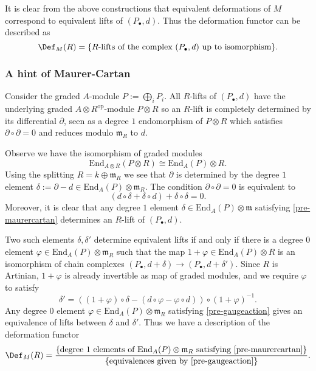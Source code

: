 It is clear from the above constructions that equivalent deformations of \(M\)
correspond to equivalent lifts of \((P_\bullet, d)\). Thus
the deformation functor can be described as
\[\Def_M(R) = \{\text{\(R\)-lifts of the complex \((P_\bullet, d)\)
up to isomorphism}\}.\]

\subsubsection{A hint of Maurer-Cartan} Consider the graded \(A\)-module
\(P:=\bigoplus_i P_i\). All \(R\)-lifts of \((P_\bullet, d)\) have the
underlying graded \(A\otimes
R^{\text{op}}\)-module \(P\otimes R\) so an \(R\)-lift is completely determined
by its differential \(\partial\), seen as a degree \(1\) endomorphism of
\(P\otimes R\) which satisfies \(\partial \circ \partial = 0\)
and reduces modulo \(\mathfrak{m}_R\) to \(d\). 

Observe we have the isomorphism of graded modules
\[\text{End}_{A\otimes R}(P\otimes R) \cong \text{End}_A(P)\otimes R.\]
Using the splitting \(R=k\oplus \mathfrak{m}_R\) we see
that \(\partial\) is determined by the degree \(1\) element
\(\delta := \partial - d \in \text{End}_A(P)\otimes
\mathfrak{m}_R.\) The condition \(\partial \circ \partial = 0\)
is equivalent to 
\begin{equation} \label{pre-maurercartan}
    (d\circ \delta + \delta \circ d) +
    \delta \circ \delta = 0.
\end{equation}
Moreover, it is clear that any degree \(1\) element \(\delta\in
\text{End}_A(P)\otimes \mathfrak{m}\) satisfying \eqref{pre-maurercartan}
determines an \(R\)-lift of \((P_\bullet,d)\). 

Two such elements \(\delta, \delta'\) determine equivalent lifts
if and only if there is a degree \(0\) element \(\varphi\in
\text{End}_A(P)\otimes \mathfrak{m}_R\) such that the map \(1+\varphi\in
\text{End}_A(P)\otimes R\) is an isomorphism of chain complexes
\((P_\bullet,d+\delta)\rightarrow (P_\bullet, d +
\delta')\). Since \(R\) is Artinian, \(1+\varphi\) is already
invertible as map of graded modules, and we require \(\varphi\) to satisfy
\begin{equation} \label{pre-gaugeaction}
    \delta' = \left((1+\varphi)\circ\delta -
    (d \circ \varphi - \varphi \circ d)\right)
    \circ (1+\varphi)^{-1}.
\end{equation}
Any degree \(0\) element \(\varphi\in \text{End}_A(P)\otimes
\mathfrak{m}_R\) satisfying \eqref{pre-gaugeaction} gives an equivalence of lifts
between \(\delta\) and \(\delta'\). Thus we have a description
of the deformation functor
\[\Def_M(R) = \frac{\{\text{degree \(1\) elements of
\(\text{End}_A(P)\otimes \mathfrak{m}_R\) satisfying
\eqref{pre-maurercartan}}\}}{\{\text{equivalences given by
\eqref{pre-gaugeaction}}\}}.\]

